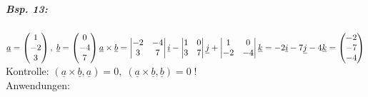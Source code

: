 \subparagraph{Bsp. 13:}\parskp
$\underline{a}=\begin{pmatrix}
1\\
-2\\
3
\end{pmatrix}, \; \underline{b}= \begin{pmatrix}
0\\
-4\\
7
\end{pmatrix}\\
\underline{a}\times \underline{b} = \begin{vmatrix}
-2 & -4\\
3 & 7
\end{vmatrix}\underline{i}- \begin{vmatrix}
1 & 0 \\
3 & 7
\end{vmatrix} \underline{j}+ \begin{vmatrix}
1 & 0\\
-2 & -4
\end{vmatrix} \underline{k}= -2 \underline{i} -7 \underline{j} - 4 \underline{k}= \begin{pmatrix}
-2\\
-7\\
-4
\end{pmatrix}$\\
Kontrolle: $(\underline{a} \times \underline{b}, \underline{a})=0, \; (\underline{a} \times \underline{b}, \underline{b})=0 \; !$\bigskip\\
Anwendungen:

